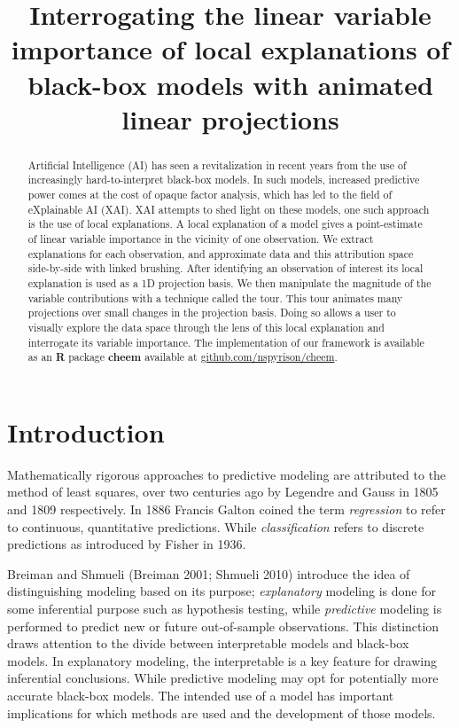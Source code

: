 \documentclass[
]{article}
\title{Interrogating the linear variable importance of local explanations of black-box models with animated linear projections}
\author{}
\date{\vspace{-2.5em}}
\begin{document}
\maketitle
\begin{abstract}
Artificial Intelligence (AI) has seen a revitalization in recent years from the use of increasingly hard-to-interpret black-box models. In such models, increased predictive power comes at the cost of opaque factor analysis, which has led to the field of eXplainable AI (XAI). XAI attempts to shed light on these models, one such approach is the use of local explanations. A local explanation of a model gives a point-estimate of linear variable importance in the vicinity of one observation. We extract explanations for each observation, and approximate data and this attribution space side-by-side with linked brushing. After identifying an observation of interest its local explanation is used as a 1D projection basis. We then manipulate the magnitude of the variable contributions with a technique called the tour. This tour animates many projections over small changes in the projection basis. Doing so allows a user to visually explore the data space through the lens of this local explanation and interrogate its variable importance. The implementation of our framework is available as an \textbf{R} package \textbf{cheem} available at \href{https://github.com/nspyrison/cheem}{github.com/nspyrison/cheem}.
\end{abstract}

\hypertarget{sec:intro}{%
\section{Introduction}\label{sec:intro}}

Mathematically rigorous approaches to predictive modeling are attributed to the method of least squares, over two centuries ago by Legendre and Gauss in 1805 and 1809 respectively. In 1886 Francis Galton coined the term \emph{regression} to refer to continuous, quantitative predictions. While \emph{classification} refers to discrete predictions as introduced by Fisher in 1936.

Breiman and Shmueli (Breiman 2001; Shmueli 2010) introduce the idea of distinguishing modeling based on its purpose; \emph{explanatory} modeling is done for some inferential purpose such as hypothesis testing, while \emph{predictive} modeling is performed to predict new or future out-of-sample observations. This distinction draws attention to the divide between interpretable models and black-box models. In explanatory modeling, the interpretable is a key feature for drawing inferential conclusions. While predictive modeling may opt for potentially more accurate black-box models. The intended use of a model has important implications for which methods are used and the development of those models.
\end{document}
